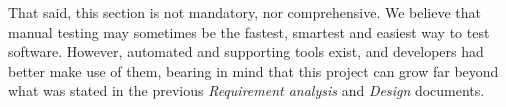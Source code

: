 That said, this section is not mandatory, nor comprehensive. We believe that manual testing may sometimes be the fastest, smartest and easiest way to test software. However, automated and supporting tools exist, and developers had better make use of them, bearing in mind that this project can grow far beyond what was stated in the previous \emph{Requirement analysis} and \emph{Design} documents.  